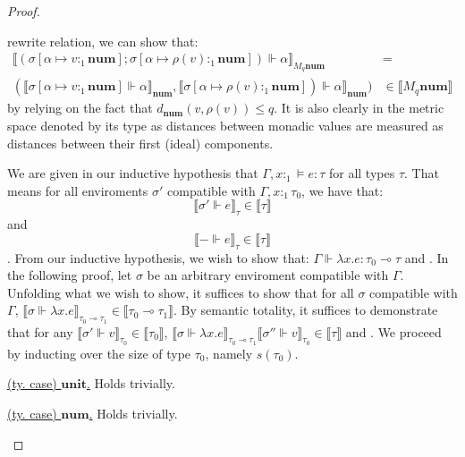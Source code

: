 \begin{proof}
\begin{description}
    rewrite relation, we can show that:
    \begin{equation}
      \begin{aligned}
        \llbracket (\sigma[\alpha \mapsto v:_1 \mathbf{num}]; \sigma[\alpha \mapsto
        \rho(v) :_1 \mathbf{num}]) \Vdash \alpha \rrbracket_{M_q \mathbf{num}} 
        &= \\
        (\llbracket \sigma[\alpha \mapsto v:_1 \mathbf{num}] \Vdash \alpha
        \rrbracket_{\mathbf{num}}, \llbracket \sigma[\alpha \mapsto \rho(v) :_1
        \mathbf{num}]) \Vdash \alpha \rrbracket_{\mathbf{num}})
        &\in \llbracket M_q \mathbf{num} \rrbracket
      \end{aligned}
    \end{equation}
    by relying on the fact that $d_{\mathbf{num}}(v, \rho(v)) \leq q$. It is
    also clearly  in the metric space denoted by its type as
    distances between monadic values are measured as distances between their
    first (ideal) components.
  \item[\textsc{(ty. rule) $\multimap I$.}] We are given in our inductive
    hypothesis that $\Gamma, x :_1 \vDash e : \tau$ for all types $\tau$. That
    means for all enviroments $\sigma'$ compatible with $\Gamma, x :_1 \tau_0$,
    we have that: 
    $$\llbracket \sigma' \Vdash e \rrbracket_{\tau} \in \llbracket \tau
    \rrbracket$$ and $$\llbracket - \Vdash e \rrbracket_{\tau} \in \llbracket
    \tau \rrbracket$$
    .
    From our inductive hypothesis, we wish to show that: $\Gamma \Vdash \lambda
    x . e : \tau_0 \multimap \tau$ and . 
    In the following proof, let $\sigma$ be an arbitrary enviroment compatible
    with $\Gamma$. Unfolding what we wish to show, it suffices to show that for
    all $\sigma$ compatible with $\Gamma$, $\llbracket \sigma \Vdash \lambda x .
    e \rrbracket_{\tau_0 \multimap \tau_1} \in \llbracket \tau_0 \multimap
    \tau_1 \rrbracket$. By semantic totality, it suffices to demonstrate that
    for any $\llbracket \sigma' \Vdash v \rrbracket_{\tau_0} \in \llbracket
    \tau_0 \rrbracket$, $\llbracket \sigma \Vdash \lambda x . e
    \rrbracket_{\tau_0 \multimap \tau_1} \llbracket \sigma'' \Vdash v
    \rrbracket_{\tau_0} \in \llbracket \tau \rrbracket$ and .
    We proceed by inducting over the size of type $\tau_0$, namely $s(\tau_0)$.
    \begin{description}
      \item{\underline{(ty. case) $\textbf{unit}$.}} Holds trivially.
      \item{\underline{(ty. case) $\textbf{num}$.}} Holds trivially.

\end{description}
\end{description}
\end{proof}
